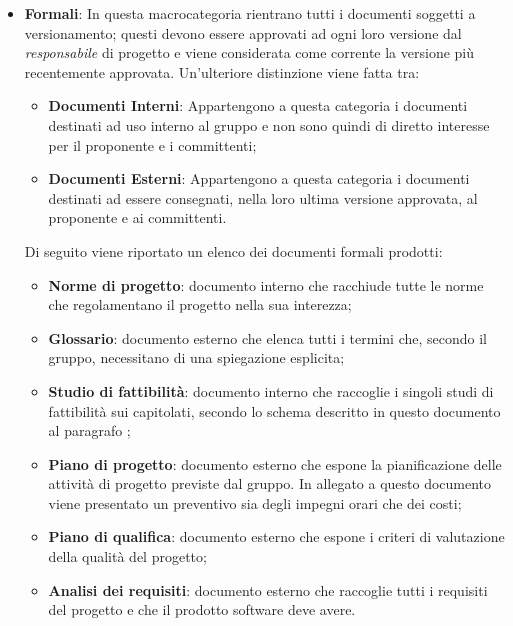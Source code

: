 \begin{itemize}
    \item \textbf{Formali}: In questa macrocategoria rientrano tutti i documenti soggetti a versionamento; questi devono 
    essere approvati ad ogni loro versione dal \emph{responsabile} di progetto e viene considerata come corrente la 
    versione più recentemente approvata. Un'ulteriore distinzione viene fatta tra:
    \begin{itemize}
        \item \textbf{Documenti Interni}: Appartengono a questa categoria i documenti destinati ad uso interno al 
        gruppo e non sono quindi di diretto interesse per il proponente e i committenti;
        \item \textbf{Documenti Esterni}: Appartengono a questa categoria i documenti destinati ad essere consegnati, 
        nella loro ultima versione approvata, al proponente e ai committenti.
    \end{itemize}
    Di seguito viene riportato un elenco dei documenti formali prodotti:
    \begin{itemize}
        \item \textbf{Norme di progetto}: documento interno che racchiude tutte le norme che regolamentano il progetto 
        nella sua interezza;
        \item \textbf{Glossario}: documento esterno che elenca tutti i termini che, secondo il gruppo, necessitano di 
        una spiegazione esplicita;
        \item \textbf{Studio di fattibilità}: documento interno che raccoglie i singoli studi di fattibilità sui 
        capitolati, secondo lo schema descritto in questo documento al paragrafo ;
        \item \textbf{Piano di progetto}: documento esterno che espone la pianificazione delle attività di progetto 
        previste dal gruppo. In allegato a questo documento viene presentato un preventivo sia degli impegni orari che 
        dei costi;
        \item \textbf{Piano di qualifica}: documento esterno che espone i criteri di valutazione della qualità del 
        progetto;
        \item \textbf{Analisi dei requisiti}: documento esterno che raccoglie tutti i requisiti del progetto e che il 
        prodotto software deve avere.
  \end{itemize}
  
\end{itemize}

